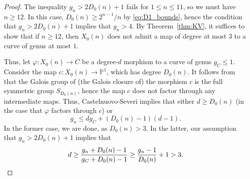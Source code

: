 \documentclass[12pt]{amsart}
\theoremstyle{definition}
\newcommand{\bbP}{\mathbb{P}}
\numberwithin{equation}{section}
\begin{document}
\begin{proof}
    The inequality $g_n > 2D_0(n) + 1$ fails for $1 \le n \le 11$, so we must have $n \ge 12$. In this case, $D_0(n) \ge 2^{n-1}/n$ by \eqref{eq:D1_bounds}, hence the condition that $g_n > 2D_0(n) + 1$ implies that $g_n > 4$. By Theorem~\ref{thm:KV}, it suffices to show that if $n\ge 12$, then $X_0(n)$ does not admit a map of degree at most $3$ to a curve of genus at most $1$.

    Thus, let $\varphi : X_0(n) \to C$ be a degree-$d$ morphism to a curve of genus $g_C \le 1$.
    Consider the map $c : X_0(n) \to \bbP^1$, which has degree $D_0(n)$. It follows from \cite[\S III, Th\'eor\`eme 3]{bousch:1992} that the Galois group of (the Galois closure of) the morphism $c$ is the full symmetric group $S_{D_0(n)}$, hence the map $c$ does not factor through any intermediate maps. Thus, Castelnuovo-Severi implies that either $d \ge D_0(n)$ (in the case that $\varphi$ factors through $c$) or
        \[
        g_n \le dg_C + (D_0(n) - 1)(d - 1).
        \]
    In the former case, we are done, as $D_0(n) > 3$. In the latter, our assumption that $g_n > 2D_0(n) + 1$ implies that
        \[
            d \ge \frac{g_n + D_0(n) - 1}{g_C + D_0(n) - 1} \ge \frac{g_n - 1}{D_0(n)} + 1 > 3. \qedhere
        \]
\end{proof}
\end{document}
